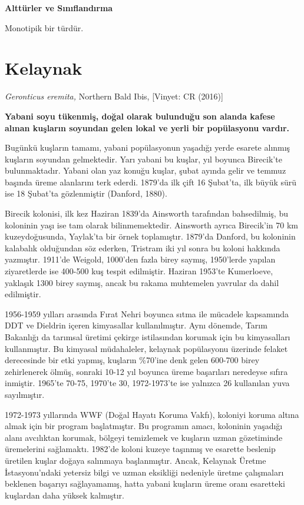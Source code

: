\documentclass[
  a4paper,
  DIV=11,
  numbers=noendperiod]{scrreprt}
\begin{document}
\textbf{Alttürler ve Sınıflandırma}

Monotipik bir türdür.

\section{Kelaynak}\label{kelaynak}

\emph{Geronticus eremita,} Northern Bald Ibis, {[}Vinyet: CR (2016){]}

\textbf{Yabani soyu tükenmiş, doğal olarak bulunduğu son alanda kafese
alınan kuşların soyundan gelen lokal ve yerli bir popülasyonu vardır.}

Bugünkü kuşların tamamı, yabani popülasyonun yaşadığı yerde esarete
alınmış kuşların soyundan gelmektedir. Yarı yabani bu kuşlar, yıl
boyunca Birecik'te bulunmaktadır. Yabani olan yaz konuğu kuşlar, şubat
ayında gelir ve temmuz başında üreme alanlarını terk ederdi. 1879'da ilk
çift 16 Şubat'ta, ilk büyük sürü ise 18 Şubat'ta gözlenmiştir (Danford,
1880).

Birecik kolonisi, ilk kez Haziran 1839'da Ainsworth tarafından
bahsedilmiş, bu koloninin yaşı ise tam olarak bilinmemektedir. Ainsworth
ayrıca Birecik'in 70 km kuzeydoğusunda, Yaylak'ta bir örnek toplamıştır.
1879'da Danford, bu koloninin kalabalık olduğundan söz ederken, Tristram
iki yıl sonra bu koloni hakkında yazmıştır. 1911'de Weigold, 1000'den
fazla birey saymış, 1950'lerde yapılan ziyaretlerde ise 400-500 kuş
tespit edilmiştir. Haziran 1953'te Kumerloeve, yaklaşık 1300 birey
saymış, ancak bu rakama muhtemelen yavrular da dahil edilmiştir.

1956-1959 yılları arasında Fırat Nehri boyunca sıtma ile mücadele
kapsamında DDT ve Dieldrin içeren kimyasallar kullanılmıştır. Aynı
dönemde, Tarım Bakanlığı da tarımsal üretimi çekirge istilasından
korumak için bu kimyasalları kullanmıştır. Bu kimyasal müdahaleler,
kelaynak popülasyonu üzerinde felaket derecesinde bir etki yapmış,
kuşların \%70'ine denk gelen 600-700 birey zehirlenerek ölmüş, sonraki
10-12 yıl boyunca üreme başarıları neredeyse sıfıra inmiştir. 1965'te
70-75, 1970'te 30, 1972-1973'te ise yalnızca 26 kullanılan yuva
sayılmıştır.

1972-1973 yıllarında WWF (Doğal Hayatı Koruma Vakfı), koloniyi koruma
altına almak için bir program başlatmıştır. Bu programın amacı,
koloninin yaşadığı alanı avcılıktan korumak, bölgeyi temizlemek ve
kuşların uzman gözetiminde üremelerini sağlamaktı. 1982'de koloni kuzeye
taşınmış ve esarette beslenip üretilen kuşlar doğaya salınmaya
başlanmıştır. Ancak, Kelaynak Üretme İstasyonu'ndaki yetersiz bilgi ve
uzman eksikliği nedeniyle üretme çalışmaları beklenen başarıyı
sağlayamamış, hatta yabani kuşların üreme oranı esaretteki kuşlardan
daha yüksek kalmıştır.
\end{document}
